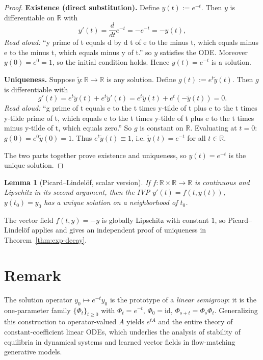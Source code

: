 \documentclass[11pt]{article}
\newtheorem{lemma}[theorem]{Lemma}
\begin{document}
\begin{proof}
\textbf{Existence (direct substitution).} Define $y(t) := e^{-t}$. Then $y$ is differentiable on
$\mathbb{R}$ with
\[
y'(t) = \frac{d}{dt} e^{-t} = -e^{-t} = -y(t),
\]
\emph{Read aloud:} ``y prime of t equals d by d t of e to the minus t, which equals minus e to the minus t, which equals minus y of t.''
so $y$ satisfies the ODE. Moreover $y(0) = e^0 = 1$, so the initial condition holds. Hence $y(t) = e^{-t}$
is a solution.

\textbf{Uniqueness.} Suppose $\tilde y : \mathbb{R} \to \mathbb{R}$ is any solution. Define
$g(t) := e^{t} \tilde y(t)$. Then $g$ is differentiable with
\[
g'(t) = e^{t} \tilde y(t) + e^{t} \tilde y'(t)
     = e^{t} \tilde y(t) + e^{t} (-\tilde y(t)) = 0.
\]
\emph{Read aloud:} ``g prime of t equals e to the t times y-tilde of t plus e to the t times y-tilde prime of t, which equals e to the t times y-tilde of t plus e to the t times minus y-tilde of t, which equals zero.''
So $g$ is constant on $\mathbb{R}$. Evaluating at $t = 0$: $g(0) = e^{0} \tilde y(0) = 1$. Thus
$e^{t} \tilde y(t) \equiv 1$, i.e. $\tilde y(t) = e^{-t}$ for all $t \in \mathbb{R}$.

The two parts together prove existence and uniqueness, so $y(t) = e^{-t}$ is the unique solution.
\end{proof}

\begin{lemma}[Picard--Lindelöf, scalar version]
If $f : \mathbb{R} \times \mathbb{R} \to \mathbb{R}$ is continuous and Lipschitz in its second argument,
then the IVP $y'(t) = f(t, y(t))$, $y(t_0) = y_0$ has a unique solution on a neighborhood of $t_0$.
\end{lemma}

The vector field $f(t, y) = -y$ is globally Lipschitz with constant $1$, so Picard--Lindelöf
applies and gives an independent proof of uniqueness in Theorem~\ref{thm:exp-decay}.

\section{Remark}

The solution operator $y_0 \mapsto e^{-t} y_0$ is the prototype of a \emph{linear semigroup}: it is
the one-parameter family $\{\Phi_t\}_{t \ge 0}$ with $\Phi_t = e^{-t}$, $\Phi_0 = \mathrm{id}$,
$\Phi_{s+t} = \Phi_s \Phi_t$. Generalizing this construction to operator-valued $A$ yields
$e^{tA}$ and the entire theory of constant-coefficient linear ODEs, which underlies the analysis
of stability of equilibria in dynamical systems and learned vector fields in flow-matching
generative models.
\end{document}
